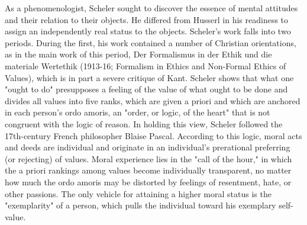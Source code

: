 \documentclass[12pt]{article}
\begin{document}
                                      As a phenomenologist, Scheler sought to discover the essence of
                                      mental attitudes and their relation to their objects. He differed from
                                      Husserl in his readiness to assign an independently real status to the
                                      objects. Scheler's work falls into two periods. During the first, his
                                      work contained a number of Christian orientations, as in the main
                                      work of this period, Der Formalismus in der Ethik und die materiale
                                      Wertethik (1913-16; Formalism in Ethics and Non-Formal Ethics of
                                      Values), which is in part a severe critique of Kant. Scheler shows
                                      that what one "ought to do" presupposes a feeling of the value of what
                                      ought to be done and divides all values into five ranks, which are
                                      given a priori and which are anchored in each person's ordo amoris,
                                      an "order, or logic, of the heart" that is not congruent with the logic
                                      of reason. In holding this view, Scheler followed the 17th-century
                                      French philosopher Blaise Pascal. According to this logic, moral acts
                                      and deeds are individual and originate in an individual's prerational
                                      preferring (or rejecting) of values. Moral experience lies in the "call
                                      of the hour," in which the a priori rankings among values become
                                      individually transparent, no matter how much the ordo amoris may
                                      be distorted by feelings of resentment, hate, or other passions. The
                                      only vehicle for attaining a higher moral status is the "exemplarity"
                                      of a person, which pulls the individual toward his exemplary
                                      self-value. 
\end{document}
